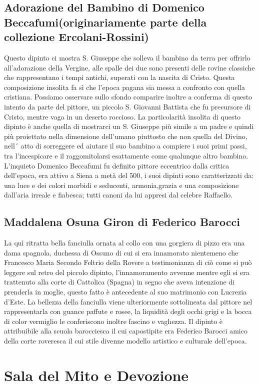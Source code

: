 \documentclass[12pt,a4paper]{article}
\begin{document}
	\subsection{Adorazione del Bambino di Domenico Beccafumi(originariamente parte della collezione Ercolani-Rossini)}
	Questo dipinto ci mostra S. Giuseppe che solleva il bambino da terra per offrirlo all'adorazione della Vergine, alle spalle dei due sono presenti delle rovine classiche che rappresentano i tempi antichi, superati con la nascita di Cristo. Questa composizione insolita fa sì che l'epoca pagana sia messa a confronto con quella cristiana. Possiamo osservare sullo sfondo comparire inoltre a conferma di questo intento da parte del pittore, un piccolo S. Giovanni Battista che fu precursore di Cristo, mentre vaga in un deserto roccioso.
	La particolarità insolita di questo dipinto è anche quella di mostrarci un S. Giuseppe più simile a un padre e quindi più proiettato nella dimensione dell'umano piuttosto che non quella del Divino, nell´ atto di sorreggere ed aiutare il suo bambino a compiere i suoi primi passi, tra l'incespicare e il raggomitolarsi esattamente come qualunque altro bambino. L'inquieto Domenico Beccafumi fu definito pittore eccentrico dalla critica dell'epoca, era attivo a Siena a metà del 500, i suoi dipinti sono caratterizzati da: una luce e dei colori morbidi e seducenti, armonia,grazia e una composizione dall'aria irreale e fiabesca; tutti canoni da lui appresi dal celebre Raffaello.
	\subsection{Maddalena Osuna Giron di Federico Barocci}
	La quì ritratta bella fanciulla ornata al collo con una gorgiera di pizzo era una dama spagnola, duchessa di Ossuno di cui si era innamorato nientemeno che Francesco Maria Secondo Feltrio della Rovere a testimonianza di ciò  come si può leggere sul retro del piccolo dipinto, l'innamoramento avvenne mentre egli si era trattenuto alla corte di Cattolica (Spagna) in segno che aveva intenzione di prenderla in moglie, questo fatto è antecedente al suo matrimonio con Lucrezia d'Este. La bellezza della fanciulla viene ulteriormente sottolineata dal pittore nel rappresentarla con guance paffute e rosee, la liquidità degli occhi grigi e la bocca di color vermiglio le conferiscono inoltre fascino e vaghezza. Il dipinto è attribuibile alla scuola barocciesca il cui capostipite era Federico Barocci amico della corte roveresca il cui stile divenne modello artistico e culturale dell'epoca.
	\section{Sala del Mito e Devozione}
\end{document}
